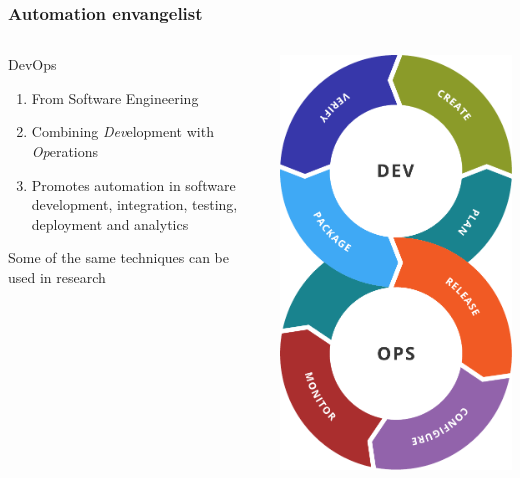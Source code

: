 \documentclass[handout, notes=hide]{beamer}
\begin{document}
\begin{frame}
\frametitle{Automation envangelist}
\setlength{\parskip}{0.5em}

\begin{columns}[T]
\begin{column}[T]{0.7\textwidth}
\setlength{\parskip}{0.7em}
DevOps
\begin{enumerate}
\item From Software Engineering
\item Combining {\it Dev\/}elopment with {\it Op\/}erations
\item Promotes automation in software development, integration, testing, deployment and analytics
\end{enumerate}

Some of the same techniques can be used in research

\end{column}
\begin{column}[T]{0.3\textwidth}
\vspace{0.0em}
\includegraphics[width=1.0\textwidth]{devops}
\end{column}
\end{columns}



\end{frame}
\end{document}
